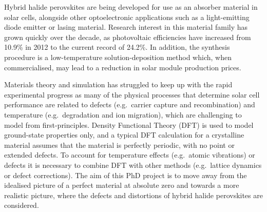 Hybrid halide perovskites are being developed for use as an absorber material in solar cells, alongside other optoelectronic applications such as a light-emitting diode emitter or lasing material. Research interest in this material family has grown quickly over the decade, as photovoltaic efficiencies have increased from 10.9\% in 2012 to the current record of 24.2\%.  In addition, the synthesis procedure is a low-temperature solution-deposition method which, when commercialised, may lead to a reduction in solar module production prices. 

Materials theory and simulation has struggled to keep up with the rapid experimental progress as many of the physical processes that determine solar cell performance are related to defects (e.g.\ carrier capture and recombination) and temperature (e.g.\ degradation and ion migration), which are challenging to model from first-principles. Density Functional Theory (DFT) is used to model ground-state properties only, and a typical DFT calculation for a crystalline material assumes that the material is perfectly periodic, with no point or extended defects. To account for temperature effects (e.g.\ atomic vibrations) or defects it is necessary to combine DFT with other methods (e.g.\ lattice dynamics or defect corrections). The aim of this PhD project is to move away from the idealised picture of a perfect material at absolute zero and towards a more realistic picture, where the defects and distortions of hybrid halide perovskites are considered.

